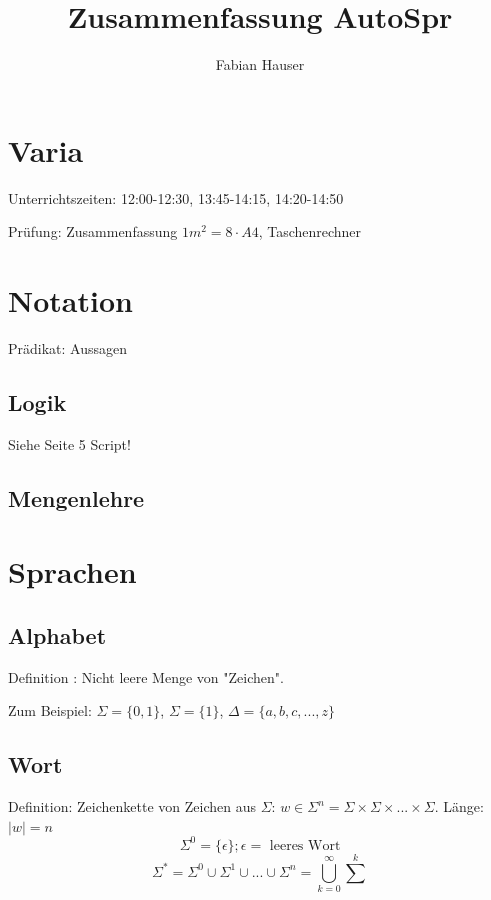 

\title{Zusammenfassung AutoSpr}
\author{Fabian Hauser}
 

\maketitle

\section{Varia}
Unterrichtszeiten: 12:00-12:30, 13:45-14:15, 14:20-14:50

Prüfung: Zusammenfassung $1m^2  = 8 \cdot A4$, Taschenrechner


\section{Notation}
Prädikat:	Aussagen

\subsection{Logik}
Siehe Seite 5 Script!

\subsection{Mengenlehre}

\section{Sprachen}

\subsection{Alphabet}
Definition : Nicht leere Menge von "Zeichen".

Zum Beispiel: $\Sigma = \{0, 1\}$, $\Sigma = \{1\}$, $\Delta = \{a,b,c,...,z\}$


\subsection{Wort}

Definition: Zeichenkette von Zeichen aus $\Sigma$: $w \in \Sigma^n = \Sigma \times \Sigma \times ... \times \Sigma$. Länge: $|w| = n$
\[
	\Sigma^0 = \{\epsilon\}; \epsilon = \text{ leeres Wort}
\]
\[
	\Sigma^\ast = \Sigma^0 \cup \Sigma^1 \cup ... \cup \Sigma^n = \bigcup^{\infty}_{k=0}{\sum^k}
\]

